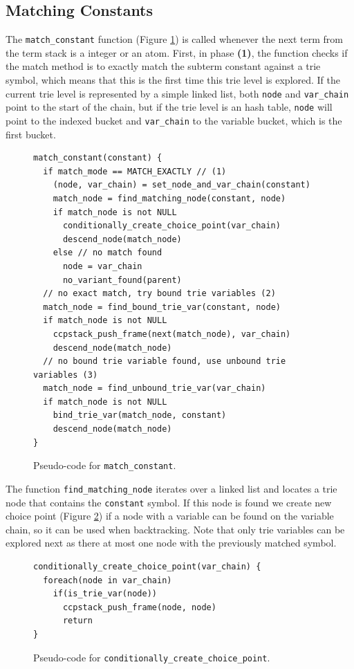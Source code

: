 \subsection{Matching Constants}

The \texttt{match\_constant} function (Figure \ref{fig:match_constant}) is called whenever the
next term from the term stack is a integer or an atom.
First, in phase \textbf{(1)}, the function checks if the match method is to exactly match the
subterm constant against a trie symbol, which means
that this is the first time this trie level is explored. If the current trie level is represented by a simple
linked list, both \texttt{node} and \texttt{var\_chain} point to the start of the chain, but if the trie level
is an hash table, \texttt{node} will point to the indexed bucket and \texttt{var\_chain} to the variable
bucket, which is the first bucket.

\begin{figure}[ht]
\begin{Verbatim}
match_constant(constant) {
  if match_mode == MATCH_EXACTLY // (1)
    (node, var_chain) = set_node_and_var_chain(constant)
    match_node = find_matching_node(constant, node)
    if match_node is not NULL
      conditionally_create_choice_point(var_chain)
      descend_node(match_node)
    else // no match found
      node = var_chain
      no_variant_found(parent)
  // no exact match, try bound trie variables (2)
  match_node = find_bound_trie_var(constant, node)
  if match_node is not NULL
    ccpstack_push_frame(next(match_node), var_chain)
    descend_node(match_node)
  // no bound trie variable found, use unbound trie variables (3)
  match_node = find_unbound_trie_var(var_chain)
  if match_node is not NULL
    bind_trie_var(match_node, constant)
    descend_node(match_node)
}
\end{Verbatim}
\caption{Pseudo-code for \texttt{match\_constant}.}
\label{fig:match_constant}
\end{figure}

The function \texttt{find\_matching\_node} iterates over a linked list and locates a trie node that contains the
\texttt{constant} symbol. If this node is found we create
new choice point (Figure \ref{fig:conditionally_create_choice_point}) if a node
with a variable can be found on the variable chain, so it can be used when backtracking. Note that only
trie variables can be explored next as there at most one node with the previously matched symbol.

\begin{figure}[ht]
\begin{Verbatim}
conditionally_create_choice_point(var_chain) {
  foreach(node in var_chain)
    if(is_trie_var(node))
      ccpstack_push_frame(node, node)
      return
}
\end{Verbatim}
\caption{Pseudo-code for \texttt{conditionally\_create\_choice\_point}.}
\label{fig:conditionally_create_choice_point}
\end{figure}

